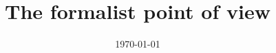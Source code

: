 \newcommand{\smath}[1]{ {\setlength{\mathindent}{0cm} \begin{equation} #1\end{equation}}%
}

\DeclarePairedDelimiter\abs{\lvert}{\rvert}%
\DeclarePairedDelimiter\norm{\lVert}{\rVert}%
\makeatletter
\let\oldabs\abs
\def\abs{\@ifstar{\oldabs}{\oldabs*}}
%
\let\oldnorm\norm
\def\norm{\@ifstar{\oldnorm}{\oldnorm*}}
\makeatother



	\title{The formalist point of view}
	\date{\today}

	\maketitle
	
	\newpage
	\tableofcontents
	\newpage
	\raggedbottom
	
	


